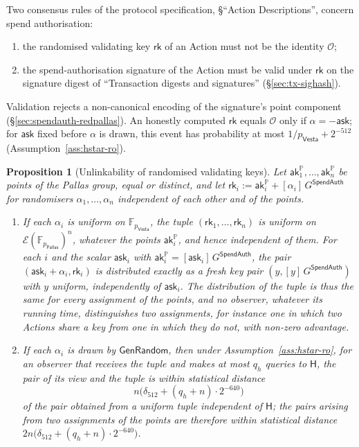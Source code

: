 \documentclass[11pt,a4paper]{article}
\newtheorem{proposition}[theorem]{Proposition}
\theoremstyle{definition}
\newcommand{\F}{\mathbb{F}}
\newcommand{\PP}{\mathbb{P}}
\newcommand{\rk}{\mathsf{rk}}
\newcommand{\Pallas}{\ensuremath{\mathsf{Pallas}}}
\newcommand{\Vesta}{\ensuremath{\mathsf{Vesta}}}
\newcommand{\Ep}{\ensuremath{\mathcal{E}}}
\newcommand{\ask}{\ensuremath{\mathsf{ask}}}
\newcommand{\aksym}{\ensuremath{\mathsf{ak}}}
\begin{document}
Two consensus rules of the protocol specification, \S``Action
Descriptions'', concern spend authorisation:
\begin{enumerate}
\item the randomised validating key $\rk$ of an Action must not be the
  identity $\mathcal{O}$;
\item the spend-authorisation signature of the Action must be valid under
  $\rk$ on the signature digest of ``Transaction digests and signatures''
  (\S\ref{sec:tx-sighash}).
\end{enumerate}
Validation rejects a non-canonical encoding of the signature's point
component (\S\ref{sec:spendauth-redpallas}). An honestly computed $\rk$
equals $\mathcal{O}$ only if $\alpha = -\ask$; for $\ask$ fixed before
$\alpha$ is drawn, this event has probability at most
$1/p_{\Vesta} + 2^{-512}$ (Assumption~\ref{ass:hstar-ro}).

\begin{proposition}[Unlinkability of randomised validating keys]%
\label{prop:rk-unlinkable}
Let $\aksym^{\PP}_1, \dots, \aksym^{\PP}_n$ be points of the Pallas group,
equal or distinct, and let
$\rk_i := \aksym^{\PP}_i + [\alpha_i]\,G^{\mathsf{SpendAuth}}$ for randomisers
$\alpha_1, \dots, \alpha_n$ independent of each other and of the points.
\begin{enumerate}
\item[(i)] If each $\alpha_i$ is uniform on $\F_{p_{\Vesta}}$, the tuple
  $(\rk_1, \dots, \rk_n)$ is uniform on $\Ep(\F_{p_{\Pallas}})^n$, whatever
  the points $\aksym^{\PP}_i$, and hence independent of them. For each $i$
  and the scalar $\ask_i$ with
  $\aksym^{\PP}_i = [\ask_i]\,G^{\mathsf{SpendAuth}}$, the pair
  $(\ask_i + \alpha_i, \rk_i)$ is distributed exactly as a fresh key pair
  $(y, [y]\,G^{\mathsf{SpendAuth}})$ with $y$ uniform, independently of
  $\ask_i$. The distribution of the tuple is thus the same for every
  assignment of the points, and no observer, whatever its running time,
  distinguishes two assignments, for instance one in which two Actions share
  a key from one in which they do not, with non-zero advantage.
\item[(ii)] If each $\alpha_i$ is drawn by $\mathsf{GenRandom}$, then under
  Assumption~\ref{ass:hstar-ro}, for an observer that receives the tuple and
  makes at most $q_h$ queries to $\mathsf{H}$, the pair of its view and the
  tuple is within statistical distance
  \[
    n\bigl(\delta_{512} + (q_h + n) \cdot 2^{-640}\bigr)
  \]
  of the pair obtained from a uniform tuple independent of $\mathsf{H}$; the
  pairs arising from two assignments of the points are therefore within
  statistical distance
  $2n\bigl(\delta_{512} + (q_h + n) \cdot 2^{-640}\bigr)$.
\end{enumerate}
\end{proposition}
\end{document}
